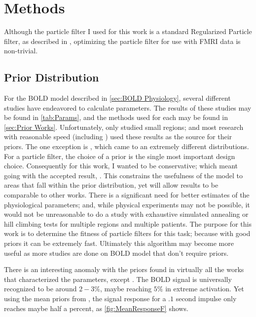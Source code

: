 \chapter{Methods}
Although the particle filter I used for this work is a standard Regularized
Particle filter, as described in \cite{Arulampalam2002a}, optimizing the 
particle filter for use with FMRI data is non-trivial. 

\section{Prior Distribution}
\label{sec:PriorDist}
For the BOLD model described in \autoref{sec:BOLD Physiology}, several
different studies have endeavored to calculate parameters. The results
of these studies may be found in \autoref{tab:Params}, and the methods 
used for each may be found in \autoref{sec:Prior Works}. Unfortunately,
\cite{Friston2000} only studied small regions; and most research with
reasonable speed (including \cite{Friston2002b}) used these results as 
the source for their priors. 
The one exception is \cite{Johnston2008}, which came to an extremely different
distributions. For a particle filter, the choice of a prior is
the single most important design choice. Consequently for this work,
I wanted to be conservative; which meant going with the accepted result,
\cite{Friston2000}. This constrains the usefulness of the model to
areas that fall within the prior distribution, yet will allow results
to be comparable to other works. There is a significant need for better
estimates of the physiological parameters; and, while physical experiments
may not be possible, it would not be unreasonable to do a study with
exhaustive simulated annealing or hill climbing tests for multiple
regions and multiple patients. The purpose for this work is to determine
the fitness of particle filters for this task; because with good 
priors it can be extremely fast. Ultimately this algorithm may become
more useful as more studies are done on BOLD model that don't require
priors. 

There is an interesting anomaly with the priors found in virtually all
the works that characterized the parameters, except \cite{Johnston2008}.
The BOLD signal is universally recognized to be around $2-3\%$, maybe
reaching $5\%$ in extreme activation. Yet using the mean priors
from \cite{Friston2000}, the signal response for a $.1$ second
impulse only reaches maybe half a percent, as \autoref{fig:MeanResponseF}
shows.

